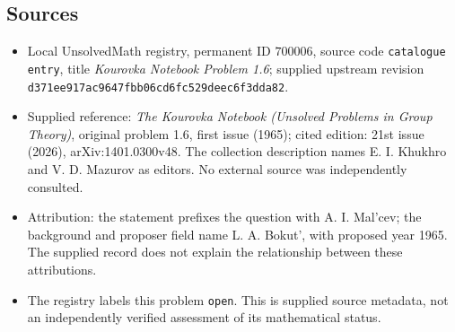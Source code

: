\documentclass[11pt]{article}
\begin{document}
\subsection{Sources}
\begin{itemize}
\item Local UnsolvedMath registry, permanent ID \(700006\), source code \texttt{catalogue entry}, title \emph{Kourovka Notebook Problem 1.6}; supplied upstream revision \texttt{d371ee917ac9647fbb06cd6fc529deec6f3dda82}.
\item Supplied reference: \emph{The Kourovka Notebook (Unsolved Problems in Group Theory)}, original problem 1.6, first issue (1965); cited edition: 21st issue (2026), arXiv:1401.0300v48. The collection description names E. I. Khukhro and V. D. Mazurov as editors. No external source was independently consulted.
\item Attribution: the statement prefixes the question with A. I. Mal'cev; the background and proposer field name L. A. Bokut', with proposed year 1965. The supplied record does not explain the relationship between these attributions.
\item The registry labels this problem \texttt{open}. This is supplied source metadata, not an independently verified assessment of its mathematical status.
\end{itemize}
\end{document}
